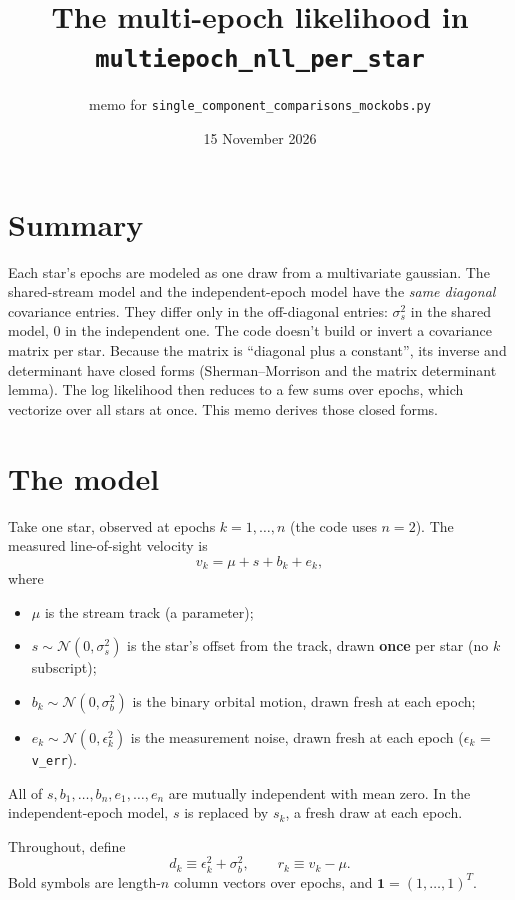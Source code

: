 \documentclass[11pt]{article}
\title{The multi-epoch likelihood in \texttt{multiepoch\_nll\_per\_star}}
\author{memo for \texttt{single\_component\_comparisons\_mockobs.py}}
\date{15 November 2026}
\newcommand{\one}{\mathbf{1}}
\begin{document}
\maketitle

\section*{Summary}
Each star's epochs are modeled as one draw from a multivariate gaussian.
The shared-stream model and the independent-epoch model have the \emph{same diagonal} covariance entries.
They differ only in the off-diagonal entries: $\sigma_s^2$ in the shared model, $0$ in the independent one.
The code doesn't build or invert a covariance matrix per star.
Because the matrix is ``diagonal plus a constant'', its inverse and determinant have closed forms
(Sherman--Morrison and the matrix determinant lemma).
The log likelihood then reduces to a few sums over epochs, which vectorize over all stars at once.
This memo derives those closed forms.

\section{The model}
Take one star, observed at epochs $k = 1, \dots, n$ (the code uses $n=2$).
The measured line-of-sight velocity is
\begin{equation}
  v_k = \mu + s + b_k + e_k ,
\end{equation}
where
\begin{itemize}
  \item $\mu$ is the stream track (a parameter);
  \item $s \sim \mathcal{N}(0, \sigma_s^2)$ is the star's offset from the track, drawn \textbf{once} per star (no $k$ subscript);
  \item $b_k \sim \mathcal{N}(0, \sigma_b^2)$ is the binary orbital motion, drawn fresh at each epoch;
  \item $e_k \sim \mathcal{N}(0, \epsilon_k^2)$ is the measurement noise, drawn fresh at each epoch ($\epsilon_k$ = \texttt{v\_err}).
\end{itemize}
All of $s, b_1, \dots, b_n, e_1, \dots, e_n$ are mutually independent with mean zero.
In the independent-epoch model, $s$ is replaced by $s_k$, a fresh draw at each epoch.

Throughout, define
\begin{equation}
  d_k \equiv \epsilon_k^2 + \sigma_b^2, \qquad r_k \equiv v_k - \mu .
\end{equation}
Bold symbols are length-$n$ column vectors over epochs, and $\one = (1, \dots, 1)^T$.
\end{document}
